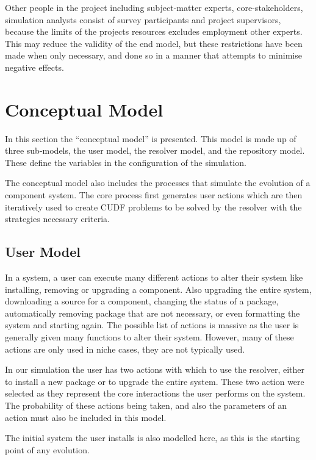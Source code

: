 Other people in the project including subject-matter experts, core-stakeholders, simulation analysts consist of survey participants and
project supervisors, because the limits of the projects resources excludes employment other experts.
This may reduce the validity of the end model, but these restrictions have been made when only necessary,
and done so in a manner that attempts to minimise negative effects.

\section{Conceptual Model}
In this section the ``conceptual model'' is presented.
This model is made up of three sub-models, the user model, the resolver model, and the repository model.
These define the variables in the configuration of the simulation.

The conceptual model also includes the processes that simulate the evolution of a component system.
The core process first generates user actions which are then iteratively used to create CUDF problems to be solved by the resolver with the strategies necessary criteria.

\subsection{User Model}
In a system, a user can execute many different actions to alter their system like installing, removing or upgrading a component.
Also upgrading the entire system, downloading a source for a component, changing the status of a package, 
automatically removing package that are not necessary, or even formatting the system and starting again.
The possible list of actions is massive as the user is generally given many functions to alter their system.
However, many of these actions are only used in niche cases, they are not typically used.

In our simulation the user has two actions with which to use the resolver, either to install a new package or to upgrade the entire system.
These two action were selected as they represent the core interactions the user performs on the system.
The probability of these actions being taken, and also the parameters of an action must also be included in this model.

The initial system the user installs is also modelled here, as this is the starting point of any evolution.

